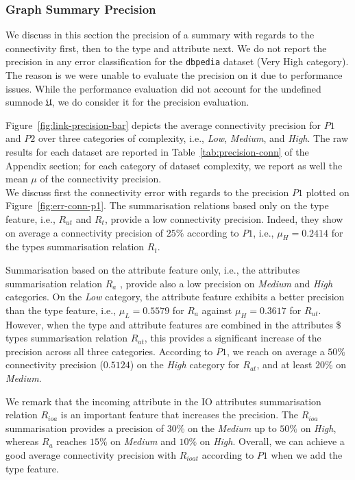 

\subsubsection{Graph Summary Precision}

We discuss in this section the precision of a summary with regards to the connectivity first, then to the type and attribute next. We do not report the precision in any error classification for the \texttt{dbpedia} dataset (Very High category). The reason is we were unable to evaluate the precision on it due to performance issues. While the performance evaluation did not account for the undefined sumnode $\mathfrak{U}$, we do consider it for the precision evaluation.


Figure~\ref{fig:link-precision-bar} depicts the average connectivity precision for $P1$ and $P2$ over three categories of complexity, i.e., \emph{Low}, \emph{Medium}, and \emph{High}. The raw results for each dataset are reported in Table~\ref{tab:precision-conn} of the Appendix section; for each category of dataset complexity, we report as well the mean $\mu$ of the connectivity precision.\\

We discuss first the connectivity error with regards to the precision $P1$ plotted on Figure~\ref{fig:err-conn-p1}.
The summarisation relations based only on the type feature, i.e., $R_{ut}$ and $R_t$, provide a low connectivity precision. Indeed, they show on average a connectivity precision of $25\%$ according to $P1$, i.e., $\mu_H=0.2414$ for the types summarisation relation $R_t$.

Summarisation based on the attribute feature only, i.e., the attributes summarisation relation $R_a$ , provide also a low precision on \emph{Medium} and \emph{High} categories. On the \emph{Low} category, the attribute feature exhibits a better precision than the type feature, i.e., $\mu_L=0.5579$ for $R_a$ against $\mu_H=0.3617$ for $R_{ut}$. However, when the type and attribute features are combined in the attributes \$ types summarisation relation $R_{at}$, this provides a significant increase of the precision across all three categories. According to $P1$, we reach on average a $50\%$ connectivity precision ($0.5124$) on the \emph{High} category for $R_{at}$, and at least $20\%$ on \emph{Medium}.

We remark that the incoming attribute in the IO attributes summarisation relation $R_{ioa}$ is an important feature that increases the precision. The $R_{ioa}$ summarisation provides a precision of $30\%$ on the \emph{Medium} up to $50\%$ on \emph{High}, whereas $R_a$ reaches $15\%$ on \emph{Medium} and $10\%$ on \emph{High}. Overall, we can achieve a good average connectivity precision with $R_{ioat}$ according to $P1$ when we add the type feature.\\

